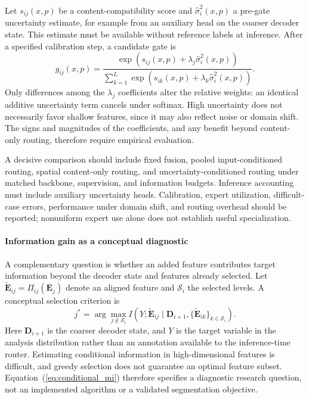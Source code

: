 \documentclass[5p,times,authoryear]{elsarticle}
\begin{document}
Let $s_{ij}(x,p)$ be a content-compatibility score and $\hat{\sigma}_i^2(x,p)$ a pre-gate uncertainty estimate, for example from an auxiliary head on the coarser decoder state. This estimate must be available without reference labels at inference. After a specified calibration step, a candidate gate is
\begin{equation}
  g_{ij}(x,p)=
  \frac{\exp\!\left(s_{ij}(x,p)+\lambda_j\hat{\sigma}_i^2(x,p)\right)}
       {\sum_{k=1}^{L}\exp\!\left(s_{ik}(x,p)+\lambda_k\hat{\sigma}_i^2(x,p)\right)}.
\end{equation}
Only differences among the $\lambda_j$ coefficients alter the relative weights: an identical additive uncertainty term cancels under softmax. High uncertainty does not necessarily favor shallow features, since it may also reflect noise or domain shift. The signs and magnitudes of the coefficients, and any benefit beyond content-only routing, therefore require empirical evaluation.

A decisive comparison should include fixed fusion, pooled input-conditioned routing, spatial content-only routing, and uncertainty-conditioned routing under matched backbone, supervision, and information budgets. Inference accounting must include auxiliary uncertainty heads. Calibration, expert utilization, difficult-case errors, performance under domain shift, and routing overhead should be reported; nonuniform expert use alone does not establish useful specialization.

\paragraph{Information gain as a conceptual diagnostic}
A complementary question is whether an added feature contributes target information beyond the decoder state and features already selected. Let $\widetilde{\mathbf E}_{ij}=\Pi_{ij}(\mathbf E_j)$ denote an aligned feature and $\mathcal S_i$ the selected levels. A conceptual selection criterion is
\begin{equation}
\label{eq:conditional_mi}
j^*=\arg\max_{j\notin\mathcal S_i}
I\!\left(Y;\widetilde{\mathbf E}_{ij}\mid
\mathbf D_{i+1},\{\widetilde{\mathbf E}_{ik}\}_{k\in\mathcal S_i}\right).
\end{equation}
Here $\mathbf D_{i+1}$ is the coarser decoder state, and $Y$ is the target variable in the analysis distribution rather than an annotation available to the inference-time router. Estimating conditional information in high-dimensional features is difficult, and greedy selection does not guarantee an optimal feature subset. Equation~(\ref{eq:conditional_mi}) therefore specifies a diagnostic research question, not an implemented algorithm or a validated segmentation objective.
\end{document}

